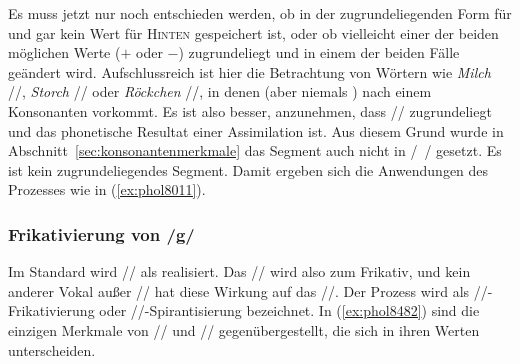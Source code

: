 
Es muss jetzt nur noch entschieden werden, ob in der zugrundeliegenden Form für \textipa{[\c{c}]} und \textipa{[X]} gar kein Wert für \textsc{Hinten} gespeichert ist, oder ob vielleicht einer der beiden möglichen Werte ($+$ oder $-$) zugrundeliegt und in einem der beiden Fälle geändert wird.
Aufschlussreich ist hier die Betrachtung von Wörtern wie \textit{Milch} //, \textit{Storch} // oder \textit{Röckchen} //, in denen \textipa{[\c{c}]} (aber niemals \textipa{[X]}) nach einem Konsonanten vorkommt.
Es ist also besser, anzunehmen, dass // zugrundeliegt und \textipa{[X]} das phonetische Resultat einer Assimilation ist.
Aus diesem Grund wurde in Abschnitt~\ref{sec:konsonantenmerkmale} das Segment \textipa{[X]} auch nicht in /~/ gesetzt.
Es ist kein zugrundeliegendes Segment.
Damit ergeben sich die Anwendungen des Prozesses wie in (\ref{ex:phol8011}).

\begin{exe}
  \ex\label{ex:phol8011}
  \begin{xlist}
  \end{xlist}
\end{exe}

\subsubsection{Frikativierung von /g/}


\label{sec:prozgfrik}

Im Standard wird // als \textipa{[I\c{c}.]} realisiert.
Das // wird also zum Frikativ, und kein anderer Vokal außer // hat diese Wirkung auf das //.
Der Prozess wird als //-Frikativierung oder //-Spirantisierung bezeichnet.
In (\ref{ex:phol8482}) sind die einzigen Merkmale von // und // gegenübergestellt, die sich in ihren Werten unterscheiden.

\begin{exe}
  \ex\label{ex:phol8482}
  \begin{xlist}
  \end{xlist}
\end{exe}

